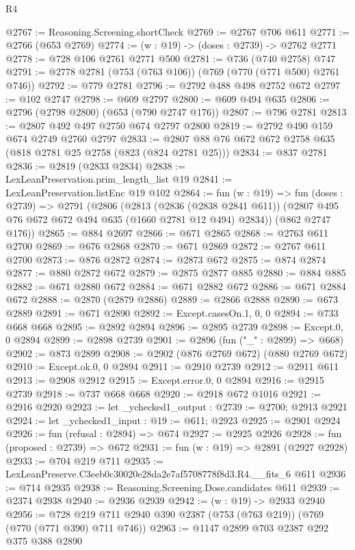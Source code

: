 \begin{lexlean}{R4}
\begin{coremodule}
@2767 := Reasoning.Screening.shortCheck
@2769 := @2767 @706 @611
@2771 := @2766 (@653 @2769)
@2774 := (w : @19) -> (doses : @2739) -> @2762 @2771
@2778 := @728 @106 @2761 @2771 @500
@2781 := @736 (@740 @2758) @747
@2791 := @2778 @2781 (@753 (@763 @106)) (@769 (@770 (@771 @500) @2761 @746))
@2792 := @779 @2781
@2796 := @2792 @488 @498 @2752 @672
@2797 := @102 @2747
@2798 := @609 @2797
@2800 := @609 @494 @635
@2806 := @2796 (@2798 @2800) (@653 (@790 @2747 @176))
@2807 := @796 @2781
@2813 := @2807 @492 @497 @2750 @674 @2797 @2800
@2819 := @2792 @490 @159 @674 @2749 @2760 @2797
@2833 := @2807 @88 @76 @672 @672 @2758 @635 (@818 @2781 @25 @2758 (@823 (@824 @2781 @25)))
@2834 := @837 @2781
@2836 := @2819 (@2833 @2834)
@2838 := LexLeanPreservation.prim_length_list @19
@2841 := LexLeanPreservation.listEnc @19 @102
@2864 := fun (w : @19) =>
  fun (doses : @2739) =>
  @2791
    (@2806
      (@2813
        (@2836 (@2838 @2841 @611))
        (@2807 @495 @76 @672 @672 @494 @635 (@1660 @2781 @12 @494) @2834))
      (@862 @2747 @176))
@2865 := @884 @2697
@2866 := @671 @2865
@2868 := @2763 @611 @2700
@2869 := @676 @2868
@2870 := @671 @2869
@2872 := @2767 @611 @2700
@2873 := @876 @2872
@2874 := @2873 @672
@2875 := @874 @2874
@2877 := @880 @2872 @672
@2879 := @2875 @2877 @885
@2880 := @884 @885
@2882 := @671 @2880 @672
@2884 := @671 @2882 @672
@2886 := @671 @2884 @672
@2888 := @2870 (@2879 @2886)
@2889 := @2866 @2888
@2890 := @673 @2889
@2891 := @671 @2890
@2892 := Except.casesOn.{1, 0, 0}
@2894 := @733 @668 @668
@2895 := @2892 @2894
@2896 := @2895 @2739
@2898 := Except.{0, 0} @2894
@2899 := @2898 @2739
@2901 := @2896 (fun ("_" : @2899) => @668)
@2902 := @873 @2899
@2908 := @2902 (@876 @2769 @672) (@880 @2769 @672)
@2910 := Except.ok.{0, 0} @2894
@2911 := @2910 @2739
@2912 := @2911 @611
@2913 := @2908 @2912
@2915 := Except.error.{0, 0} @2894
@2916 := @2915 @2739
@2918 := @737 @668 @668
@2920 := @2918 @672 @1016
@2921 := @2916 @2920
@2923 := let _ychecked1_output : @2739 := @2700; @2913 @2921
@2924 := let _ychecked1_input : @19 := @611; @2923
@2925 := @2901 @2924
@2926 := fun (refusal : @2894) => @674
@2927 := @2925 @2926
@2928 := fun (proposed : @2739) => @672
@2931 := fun (w : @19) => @2891 (@2927 @2928)
@2933 := @704 @219 @711
@2935 := LexLeanPreserve.C3eeb0c30020e28da2e7af5708778f8d3.R4.__fits_6 @611
@2936 := @714 @2935
@2938 := Reasoning.Screening.Dose.candidates @611
@2939 := @2374 @2938
@2940 := @2936 @2939
@2942 := (w : @19) -> @2933 @2940
@2956 := @728 @219 @711 @2940 @390 @2387 (@753 (@763 @219)) (@769 (@770 (@771 @390) @711 @746))
@2963 := @1147 @2899 @703 @2387 @292 @375 @388 @2890

\end{coremodule}
\end{lexlean}
